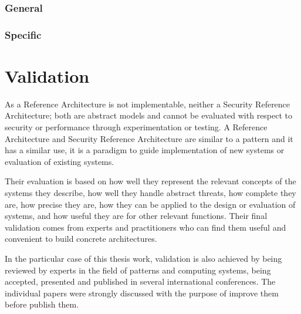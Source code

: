 		\subsubsection{General}

		\subsubsection{Specific}

\section{Validation}
As a Reference Architecture is not implementable, neither a Security Reference Architecture; both are abstract models and cannot be evaluated with respect to security or performance through experimentation or testing. A Reference Architecture and Security Reference Architecture are similar to a pattern and it has a similar use, it is a paradigm to guide implementation of new systems
or evaluation of existing systems.

Their evaluation is based on how well they represent the relevant concepts of the systems they describe, how well they handle abstract threats, how complete they are, how precise they are, how they can be applied to the design or evaluation of systems, and how useful they are for other relevant functions. Their final validation comes from experts and practitioners who can find them useful and convenient to build concrete architectures.

In the particular case of this thesis work, validation is also achieved by being reviewed by experts in the field of patterns and computing systems, being accepted, presented and published in several international conferences. The individual papers were strongly discussed with the purpose of improve them before publish them.


